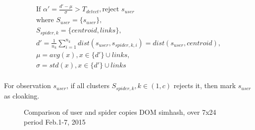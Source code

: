 \begin{equation}
  \label{coefficient:detect}
  \begin{gathered}
    \text {If } \alpha' = \frac{d' - \mu}{\sigma} > T_{detect}, \text{reject } s_{user} \\
    \text{where }
    S_{user} = \{s_{user}\}, \\
   S_{spider, k} = \{centroid, links\}, \\
    d' = \frac{1}{n_k}\sum_{i=1}^{n_k} dist(s_{user}, s_{spider, k, i}) =
    dist(s_{user}, centroid), \\ 
    \mu = avg(x), x \in  \{d'\} \cup links, \\
    \sigma = std(x), x \in \{d'\} \cup links \\
  \end{gathered}
\end{equation}

For observation $s_{user}$, if all clusters $S_{spider, k}, k \in (1, c)$ rejects it, then
mark $s_{user}$ as cloaking.

\begin{figure}[t]
  \centering
  \caption{Comparison of user and spider copies DOM simhash, over 7x24 period Feb.1-7, 2015}
  \label{fig:google-simhash}
\end{figure}

